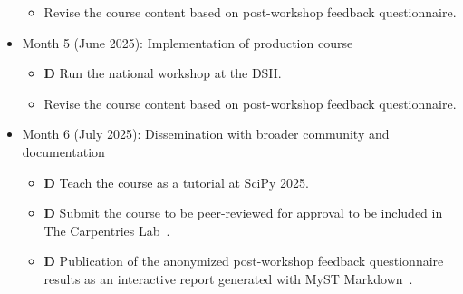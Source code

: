 \documentclass[letterpaper, 11pt]{article}
\newcommand{\deliverable}{\textbf{\textrm{D}}}
\begin{document}
\begin{itemize}
\begin{itemize}
      \item Revise the course content based on post-workshop feedback questionnaire.
    \end{itemize}
  \item Month 5 (June 2025): Implementation of production course
    \begin{itemize}
      \item \deliverable{} Run the national workshop at the DSH.
      \item Revise the course content based on post-workshop feedback questionnaire.
    \end{itemize}
  \item Month 6 (July 2025): Dissemination with broader community and documentation
    \begin{itemize}
      \item \deliverable{} Teach the course as a tutorial at SciPy 2025.
      \item \deliverable{} Submit the course to be peer-reviewed for approval to be included in The Carpentries Lab~\cite{carpentries_lab}.
      \item \deliverable{} Publication of the anonymized post-workshop feedback questionnaire results as an interactive report generated with MyST Markdown~\cite{executable_books_community}.
    \end{itemize}
\end{itemize}

\clearpage
%
\vspace*{-0.25cm}
\begin{footnotesize}
%
 
 
%
\end{footnotesize}
\end{document}
